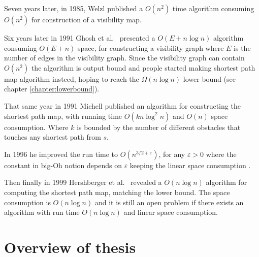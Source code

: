 Seven years later, in 1985, Welzl \cite{DBLP:journals/ipl/Welzl85} published a
$O(n^2)$ time algorithm consuming $O(n^2)$ for construction of a visibility
map.  

Six years later in 1991 Ghosh et al.\ \cite{GhoshM91} presented a $O(E+n\log n)$
algorithm consuming $O(E+n)$ space, for constructing a visibility graph where
$E$ is the number of edges in the visibility graph.
Since the visibility graph can contain $O(n^2)$ the algorithm is output bound
and people started making shortest path map algorithm insteed, hoping to reach
the $\Omega{(n\log n)}$ lower bound (see chapter \ref{chapter:lowerbound}).

That same year in 1991 Michell \cite{DBLP:journals/amai/Mitchell91} published
an algorithm for constructing the shortest path map, with running time
$O(kn\log^2 n)$ and $O(n)$ space consumption. Where $k$ is bounded by the
number of different obstacles that touches any shortest path from $s$.

In 1996 he improved the run time to $O(n^{3/2+\varepsilon})$, for any
$\varepsilon>0$ where the constant in big-Oh notion depends on $\varepsilon$
keeping the linear space consumption  \cite{DBLP:journals/ijcga/Mitchell96}.

Then finally in 1999 Hershberger et al.\ \cite{HershbergerS99} revealed a
$O(n\log n)$ algorithm for computing the shortest path map, matching the lower
bound. The space consumption is $O(n\log n)$ and it is still an open problem if
there exists an algorithm with run time $O(n\log n)$ and linear space
consumption.

\section{Overview of thesis}
